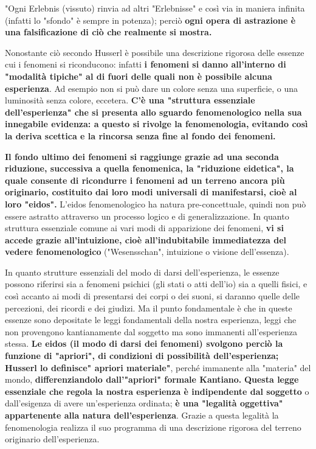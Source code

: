 "Ogni Erlebnis (vissuto) rinvia ad altri "Erlebnisse"
e così via in maniera infinita (infatti lo "sfondo" è
sempre in potenza); perciò \textbf{ogni opera di
astrazione è una falsificazione di ciò che
realmente si mostra.}

Nonostante ciò secondo Husserl è possibile
una descrizione rigorosa delle essenze cui
i fenomeni si riconducono: infatti \textbf{i fenomeni
si danno all'interno di "modalità tipiche"
al di fuori delle quali non è possibile alcuna
esperienza}. Ad esempio non si può dare un
colore senza una superficie, o una luminosità senza colore, eccetera. \textbf{C'è una "struttura
essenziale dell'esperienza" che si presenta allo
sguardo fenomenologico nella sua innegabile
evidenza: a questo si rivolge la fenomenologia, evitando così la deriva scettica e la
rincorsa senza fine al fondo dei fenomeni.}

\textbf{Il fondo ultimo dei fenomeni si raggiunge
grazie ad una seconda riduzione, successiva a
quella fenomenica, la "riduzione eidetica",
la quale consente di ricondurre i fenomeni
ad un terreno ancora più originario,
costituito dai loro modi universali di
manifestarsi, cioè al loro "eidos".}
L'eidos fenomenologico ha natura pre-concettuale,
quindi non può essere astratto attraverso un processo
logico e di generalizzazione. In quanto struttura
essenziale comune ai vari modi di apparizione dei
fenomeni, \textbf{vi si accede grazie all'intuizione, cioè
all'indubitabile immediatezza del vedere
fenomenologico} ("Wesensschan", intuizione o
visione dell'essenza).

In quanto strutture essenziali del modo di darsi
dell'esperienza, le essenze possono riferirsi
sia a fenomeni psichici (gli stati o atti dell'io)
sia a quelli fisici, e così accanto ai modi di
presentarsi dei corpi o dei suoni, si daranno quelle
delle percezioni, dei ricordi e dei giudizi.
Ma il punto fondamentale è che in queste
essenze sono depositate le leggi fondamentali
della nostra esperienza, leggi che non
provengono kantianamente dal soggetto ma sono
immanenti all'esperienza stessa. \textbf{Le eidos (il modo di darsi dei fenomeni)
svolgono perciò la funzione di "apriori", di
condizioni di possibilità dell'esperienza;
Husserl lo definisce" apriori materiale"}, perché
immanente alla "materia" del mondo, \textbf{differenziandolo dall'"apriori" formale Kantiano.}
\textbf{Questa legge essenziale che regola la nostra
esperienza è indipendente dal soggetto }o dall'esigenza di avere un'esperienza ordinata;
\textbf{è una "legalità oggettiva" appartenente alla
natura dell'esperienza}. Grazie a questa
legalità la fenomenologia realizza il suo
programma di una descrizione rigorosa
del terreno originario dell'esperienza.

